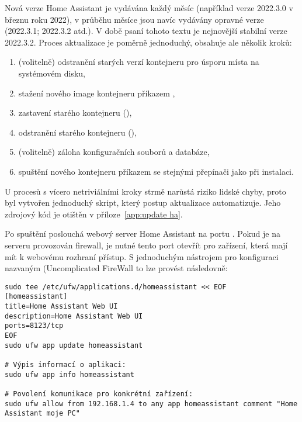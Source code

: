 Nová verze Home Assistant je vydávána každý měsíc (například verze 2022.3.0
v březnu roku 2022), v průběhu měsíce jsou navíc vydávány opravné verze
(2022.3.1; 2022.3.2 atd.). V době psaní tohoto textu je nejnovější stabilní
verze 2022.3.2.
Proces aktualizace je poměrně jednoduchý, obsahuje ale několik kroků:
\begin{enumerate}[nosep]
    \item (volitelně) odstranění starých verzí kontejneru pro úsporu místa na
        systémovém disku,

    \item stažení nového image kontejneru příkazem ,

    \item zastavení starého kontejneru (),

    \item odstranění starého kontejneru (),

    \item (volitelně) záloha konfiguračních souborů a databáze,

    \item spuštění nového kontejneru příkazem  se stejnými
        přepínači jako při instalaci.
\end{enumerate}
U procesů s vícero netriviálními kroky strmě narůstá riziko lidské chyby,
proto byl vytvořen jednoduchý skript, který postup aktualizace automatizuje.
Jeho zdrojový kód je otištěn v příloze~\vref{app:update ha}.

Po spuštění poslouchá webový server Home Assistant na portu .
Pokud je na serveru provozován firewall, je nutné tento port otevřít pro
zařízení, která mají mít k webovému rozhraní přístup. S jednoduchým nástrojem
pro konfiguraci  nazvaným 
(\foreignlanguage{english}{Uncomplicated FireWall} to lze provést následovně:
\begin{lstlisting}[language=mybash]
sudo tee /etc/ufw/applications.d/homeassistant << EOF
[homeassistant]
title=Home Assistant Web UI
description=Home Assistant Web UI
ports=8123/tcp
EOF
sudo ufw app update homeassistant

# Výpis informací o aplikaci:
sudo ufw app info homeassistant

# Povolení komunikace pro konkrétní zařízení:
sudo ufw allow from 192.168.1.4 to any app homeassistant comment "Home Assistant moje PC"
\end{lstlisting}


